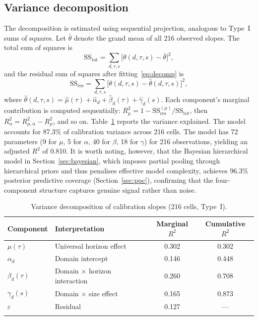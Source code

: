 \documentclass[numsec,webpdf,modern,medium]{oup-authoring-template}
\theoremstyle{thmstyleone}%
\theoremstyle{thmstyletwo}%
\theoremstyle{thmstylethree}%
\begin{document}
\subsection{Variance decomposition}\label{sec:variance}

The decomposition is estimated using sequential projection, analogous to Type~I sums of squares. Let $\bar{\theta}$ denote the grand mean of all 216 observed slopes. The total sum of squares is
\begin{equation}\label{eq:sstot}
\mathrm{SS}_{\mathrm{tot}} = \sum_{d,\tau,s} \bigl[\theta(d,\tau,s) - \bar{\theta}\bigr]^2,
\end{equation}
and the residual sum of squares after fitting~\eqref{eq:decomp} is
\begin{equation}\label{eq:ssres}
\mathrm{SS}_{\mathrm{res}} = \sum_{d,\tau,s} \bigl[\theta(d,\tau,s) - \hat{\theta}(d,\tau,s)\bigr]^2,
\end{equation}
where $\hat{\theta}(d,\tau,s) = \hat{\mu}(\tau) + \hat{\alpha}_d + \hat{\beta}_d(\tau) + \hat{\gamma}_d(s)$. Each component's marginal contribution is computed sequentially: $R^2_\mu = 1 - \mathrm{SS}_{\mathrm{res}}^{(\mu)} / \mathrm{SS}_{\mathrm{tot}}$, then $R^2_\alpha = R^2_{\mu,\alpha} - R^2_\mu$, and so on. Table~\ref{tab:variance} reports the variance explained. The model accounts for 87.3\% of calibration variance across 216 cells. The model has 72 parameters (9 for $\mu$, 5 for $\alpha$, 40 for $\beta$, 18 for $\gamma$) for 216 observations, yielding an adjusted $R^2$ of 0.810. It is worth noting, however, that the Bayesian hierarchical model in Section~\ref{sec:bayesian}, which imposes partial pooling through hierarchical priors and thus penalises effective model complexity, achieves 96.3\% posterior predictive coverage (Section~\ref{sec:ppc}), confirming that the four-component structure captures genuine signal rather than noise.

\begin{table}[!t]
\caption{Variance decomposition of calibration slopes (216 cells, Type~I).\label{tab:variance}}%
\begin{tabular*}{\columnwidth}{@{\extracolsep\fill}llcc@{\extracolsep\fill}}
\toprule
Component & Interpretation & Marginal $R^2$ & Cumulative $R^2$ \\
\midrule
$\mu(\tau)$       & Universal horizon effect       & 0.302 & 0.302 \\
$\alpha_d$        & Domain intercept               & 0.146 & 0.448 \\
$\beta_d(\tau)$   & Domain $\times$ horizon interaction & 0.260 & 0.708 \\
$\gamma_d(s)$     & Domain $\times$ size effect    & 0.165 & 0.873 \\
$\varepsilon$     & Residual                       & 0.127 & --- \\
\botrule
\end{tabular*}
\end{table}
\end{document}
